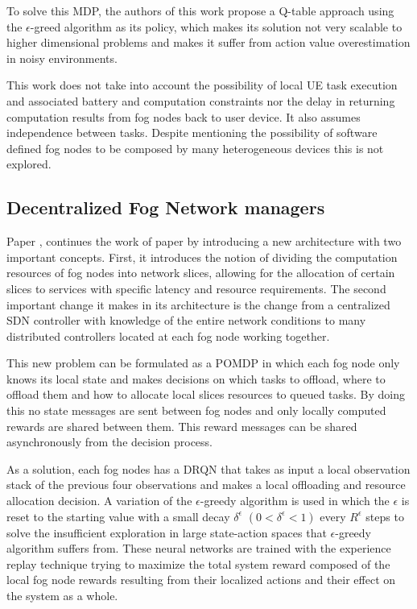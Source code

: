 To solve this \acrshort{MDP}, the authors of this work propose a Q-table approach using the $\epsilon$-greed algorithm as its policy, which makes its solution not very scalable to higher dimensional problems and makes it suffer from action value overestimation in noisy environments.

This work does not take into account the possibility of local \acrshort{UE} task execution and associated battery and computation constraints nor the delay in returning computation results from fog nodes back to user device.  It also assumes independence between tasks. Despite mentioning the possibility of software defined fog nodes to be composed by many heterogeneous devices this is not explored.


\subsection{Decentralized Fog Network managers}
\noindent Paper \cite{fogmulti}, continues the work of paper \cite{centralfog} by introducing a new architecture with two important concepts. First, it introduces the notion of dividing the computation resources of fog nodes into network slices, allowing for the allocation of certain slices to services with specific latency and resource requirements. The second important change it makes in its architecture is the change from a centralized \acrshort{SDN} controller with knowledge of the entire network conditions to many distributed controllers located at each fog node working together.

This new problem can be formulated as a \acrfull{POMDP} in which each fog node only knows its local state and makes decisions on which tasks to offload, where to offload them and how to allocate local slices resources to queued tasks. By doing this no state messages are sent between fog nodes and only locally computed rewards are shared between them. This reward messages can be shared asynchronously from the decision process.

As a solution, each fog nodes has a \acrfull{DRQN} that takes as input a local observation stack of the previous four observations and makes a local offloading and resource allocation decision. A variation of the $\epsilon$-greedy algorithm is used in which the $\epsilon$ is reset to the starting value with a small decay $\delta^\epsilon$ $(0<\delta^\epsilon < 1)$ every $R^\epsilon$ steps to solve the insufficient exploration in large state-action spaces that $\epsilon$-greedy algorithm suffers from. These neural networks are trained with the experience replay technique trying to maximize the total system reward composed of the local fog node rewards resulting from their localized actions and their effect on the system as a whole.

